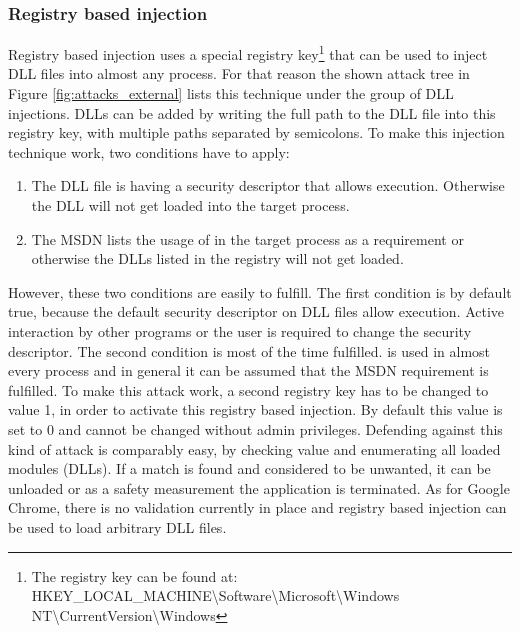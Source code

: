 \subsubsection{Registry based injection}
Registry based injection uses a special registry key\footnote{The registry key can be found at: HKEY\_LOCAL\_MACHINE\textbackslash Software\textbackslash Microsoft\textbackslash Windows NT\textbackslash CurrentVersion\textbackslash Windows} that can be used to inject \gls{DLL} files into almost any process. For that reason the shown attack tree in Figure \ref{fig:attacks_external} lists this technique under the group of \gls{DLL} injections. \glspl{DLL} can be added by writing the full path to the \gls{DLL} file into this registry key, with multiple paths separated by semicolons. To make this injection technique work, two conditions have to apply:
\begin{enumerate}
\item The \gls{DLL} file is having a security descriptor that allows execution. Otherwise the \gls{DLL} will not get loaded into the target process.
\item The \gls{MSDN}\cite{msdn_appinitdlls} lists the usage of  in the target process as a requirement or otherwise the \glspl{DLL} listed in the registry will not get loaded.
\end{enumerate}
However, these two conditions are easily to fulfill. The first condition is by default true, because the default security descriptor on \gls{DLL} files allow execution. Active interaction by other programs or the user is required to change the security descriptor. The second condition is most of the time fulfilled.  is used in almost every process and in general it can be assumed that the \gls{MSDN} requirement is fulfilled. To make this attack work, a second registry key  has to be changed to value 1, in order to activate this registry based injection. By default this value is set to 0 and cannot be changed without admin privileges.
Defending against this kind of attack is comparably easy, by checking  value and enumerating all loaded modules (\glspl{DLL}). If a match is found and considered to be unwanted, it can be unloaded or as a safety measurement the application is terminated. As for Google Chrome, there is no validation currently in place and registry based injection can be used to load arbitrary \gls{DLL} files.